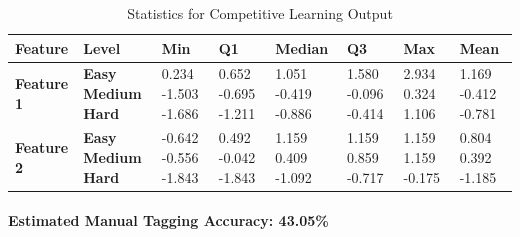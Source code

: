 \documentclass[12pt]{article}
\begin{document}
	\begin{center}
	\begin{table}[h]
		\begin{tabular}{ | m{2cm} | m{1.7cm} | m{1.3cm} | m{1.3cm} | m{1.5cm} | m{1.3cm} | m{1.3cm} | m{1.3cm} | }
		\hline
		\textbf{Feature} & \textbf{Level} & \textbf{Min} & \textbf{Q1} & \textbf{Median} & \textbf{Q3} & \textbf{Max} & \textbf{Mean}\\ 
		\hline
		\textbf{Feature 1} & \textbf{Easy Medium Hard} & 0.234 \hspace{5mm}-1.503 \hspace{5mm}-1.686 & 0.652 \hspace{5mm}-0.695 \hspace{5mm}-1.211 & 1.051  \hspace{5mm}-0.419 \hspace{5mm}-0.886 & 1.580 \hspace{5mm}-0.096 \hspace{5mm}-0.414 & 2.934 \hspace{5mm}0.324 \hspace{5mm}1.106 & 1.169 \hspace{5mm}-0.412 \hspace{5mm}-0.781\\
		\hline
		\textbf{Feature 2} & \textbf{Easy Medium Hard} & -0.642 \hspace{5mm}-0.556 \hspace{5mm}-1.843 & 0.492 \hspace{5mm}-0.042 \hspace{5mm}-1.843 & 1.159  \hspace{5mm}0.409 \hspace{5mm}-1.092 & 1.159 \hspace{5mm}0.859 \hspace{5mm}-0.717 & 1.159 \hspace{5mm}1.159 \hspace{5mm}-0.175 & 0.804 \hspace{5mm}0.392 \hspace{5mm}-1.185\\
		\hline
		\end{tabular}
		\caption{Statistics for Competitive Learning Output}
	\end{table}
	\end{center}
	
	\paragraph{Estimated Manual Tagging Accuracy: 43.05\%}
	
\end{document}

